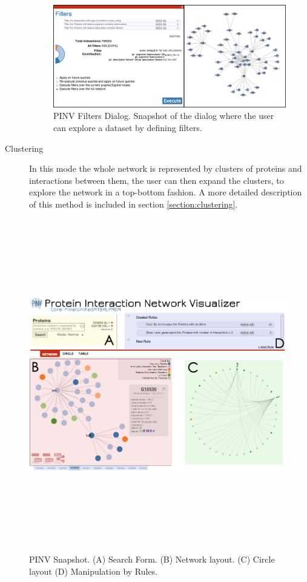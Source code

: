 \begin{description}
\begin{figure}[ht]
\centering
\includegraphics[width=\textwidth]{figures/PinvFilters.png}
\caption[PINV Filters Dialog.]{PINV Filters Dialog. Snapshot of the dialog where the user can explore a dataset by defining filters.
\label{fig:pinv_filters}}
\end{figure}

\item[Clustering] In this mode the whole network is represented by clusters of proteins and interactions between them, the user can then expand the clusters, to explore the network in a top-bottom fashion. A more detailed description of this method is included in section \ref{section:clustering}.
\end{description}

\begin{figure}  
\includegraphics[height=5.7in,angle=90]{figures/pinv.png}
\caption[PINV Snapshot.]{PINV Snapshot. (A) Search Form. (B) Network layout. (C) Circle layout (D) Manipulation by Rules.
\label{fig:pinv}}
\end{figure}

